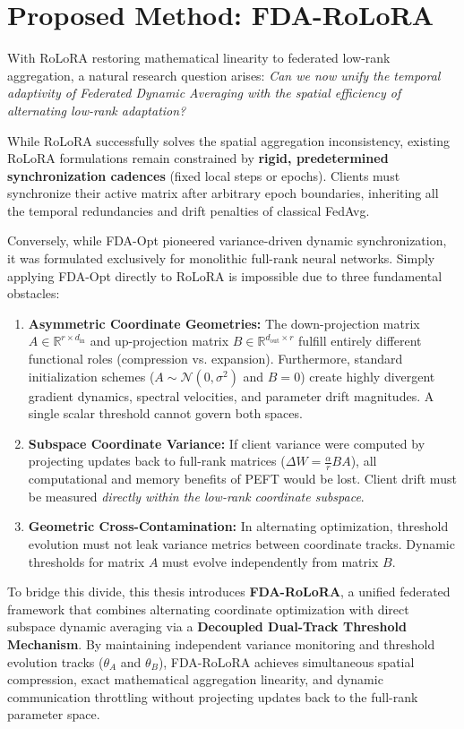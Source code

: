 \section{Proposed Method: FDA-RoLoRA}
\label{sec:intro-fdarolora}
With RoLoRA restoring mathematical linearity to federated low-rank aggregation, a natural research question arises: \emph{Can we now unify the temporal adaptivity of Federated Dynamic Averaging with the spatial efficiency of alternating low-rank adaptation?}

While RoLoRA successfully solves the spatial aggregation inconsistency, existing RoLoRA formulations remain constrained by \textbf{rigid, predetermined synchronization cadences} (fixed local steps or epochs). Clients must synchronize their active matrix after arbitrary epoch boundaries, inheriting all the temporal redundancies and drift penalties of classical FedAvg.

Conversely, while FDA-Opt \cite{theologitis2025fda} pioneered variance-driven dynamic synchronization, it was formulated exclusively for monolithic full-rank neural networks. Simply applying FDA-Opt directly to RoLoRA is impossible due to three fundamental obstacles:
\begin{enumerate}
    \item \textbf{Asymmetric Coordinate Geometries:} The down-projection matrix $A \in \mathbb{R}^{r \times d_{\text{in}}}$ and up-projection matrix $B \in \mathbb{R}^{d_{\text{out}} \times r}$ fulfill entirely different functional roles (compression vs. expansion). Furthermore, standard initialization schemes ($A \sim \mathcal{N}(0, \sigma^2)$ and $B = 0$) create highly divergent gradient dynamics, spectral velocities, and parameter drift magnitudes. A single scalar threshold cannot govern both spaces.
    \item \textbf{Subspace Coordinate Variance:} If client variance were computed by projecting updates back to full-rank matrices ($\Delta W = \frac{\alpha}{r} BA$), all computational and memory benefits of PEFT would be lost. Client drift must be measured \emph{directly within the low-rank coordinate subspace}.
    \item \textbf{Geometric Cross-Contamination:} In alternating optimization, threshold evolution must not leak variance metrics between coordinate tracks. Dynamic thresholds for matrix $A$ must evolve independently from matrix $B$.
\end{enumerate}

To bridge this divide, this thesis introduces \textbf{FDA-RoLoRA}, a unified federated framework that combines alternating coordinate optimization with direct subspace dynamic averaging via a \textbf{Decoupled Dual-Track Threshold Mechanism}. By maintaining independent variance monitoring and threshold evolution tracks ($\theta_A$ and $\theta_B$), FDA-RoLoRA achieves simultaneous spatial compression, exact mathematical aggregation linearity, and dynamic communication throttling without projecting updates back to the full-rank parameter space.

